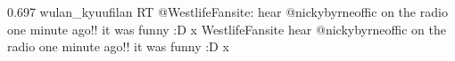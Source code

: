 {0.697}
{\joinNameTweet
{wulan\_kyuufilan}
{RT @WestlifeFansite: hear @nickybyrneoffic on the radio one minute ago!! it was funny :D x}}
{\joinNameTweet
{WestlifeFansite}
{hear @nickybyrneoffic on the radio one minute ago!! it was funny :D x}}
%
%
%
%
%
%
%
%
